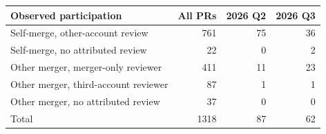 \begin{tabular}{lrrr}
\toprule
Observed participation & All PRs & 2026 Q2 & 2026 Q3 \\
\midrule
Self-merge, other-account review & 761 & 75 & 36 \\
Self-merge, no attributed review & 22 & 0 & 2 \\
Other merger, merger-only reviewer & 411 & 11 & 23 \\
Other merger, third-account reviewer & 87 & 1 & 1 \\
Other merger, no attributed review & 37 & 0 & 0 \\
\midrule
Total & 1318 & 87 & 62 \\
\bottomrule
\end{tabular}
